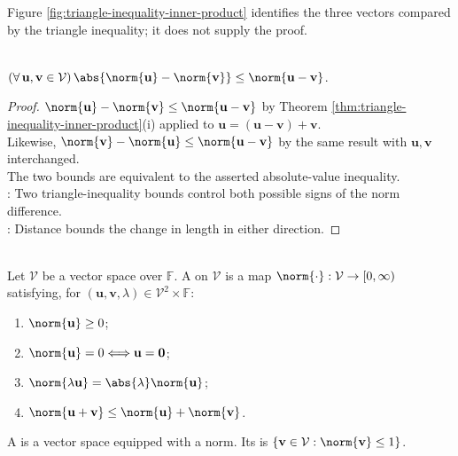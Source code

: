 \begin{illustrationfigure}[H]
  \centering
  
  \caption{The direct displacement $\mathbf{u}+\mathbf{v}$ is no longer than the two-step path with legs $\mathbf{u}$ and $\mathbf{v}$.}
  \label{fig:triangle-inequality-inner-product}
\end{illustrationfigure}

Figure \ref{fig:triangle-inequality-inner-product} identifies the three vectors compared by the triangle inequality; it does not supply the proof.

\begin{proposition} \label{prop:reverse-triangle-inequality-inner-product} \\
$(\forall\,\mathbf{u},\mathbf{v}\in\mathcal{V})\,\abs{\norm{\mathbf{u}}-\norm{\mathbf{v}}}\leq\norm{\mathbf{u}-\mathbf{v}}$.
\begin{proof}
$\norm{\mathbf{u}}-\norm{\mathbf{v}}\leq\norm{\mathbf{u}-\mathbf{v}}$ by Theorem \ref{thm:triangle-inequality-inner-product}(i) applied to $\mathbf{u}=(\mathbf{u}-\mathbf{v})+\mathbf{v}$.\\
Likewise, $\norm{\mathbf{v}}-\norm{\mathbf{u}}\leq\norm{\mathbf{u}-\mathbf{v}}$ by the same result with $\mathbf{u},\mathbf{v}$ interchanged.\\
The two bounds are equivalent to the asserted absolute-value inequality.\\
: Two triangle-inequality bounds control both possible signs of the norm difference.\\
: Distance bounds the change in length in either direction.
\end{proof}
\end{proposition}

\begin{definition} \label{def:norm-and-normed-vector-space} \\
Let $\mathcal{V}$ be a vector space over $\mathbb{F}$. A  on $\mathcal{V}$ is a map $\norm{\cdot}:\mathcal{V}\to[0,\infty)$ satisfying, for $(\mathbf{u},\mathbf{v},\lambda)\in\mathcal{V}^2\times\mathbb{F}$:
\begin{enumerate}[label=(\roman*)]
\setlength{\itemsep}{0pt}
\item $\norm{\mathbf{u}}\geq0$;
\item $\norm{\mathbf{u}}=0\Longleftrightarrow\mathbf{u}=\mathbf{0}$;
\item $\norm{\lambda\mathbf{u}}=\abs{\lambda}\norm{\mathbf{u}}$;
\item $\norm{\mathbf{u}+\mathbf{v}}\leq\norm{\mathbf{u}}+\norm{\mathbf{v}}$.
\end{enumerate}
A  is a vector space equipped with a norm. Its  is $\{\mathbf{v}\in\mathcal{V}:\norm{\mathbf{v}}\leq1\}$.
\end{definition}

